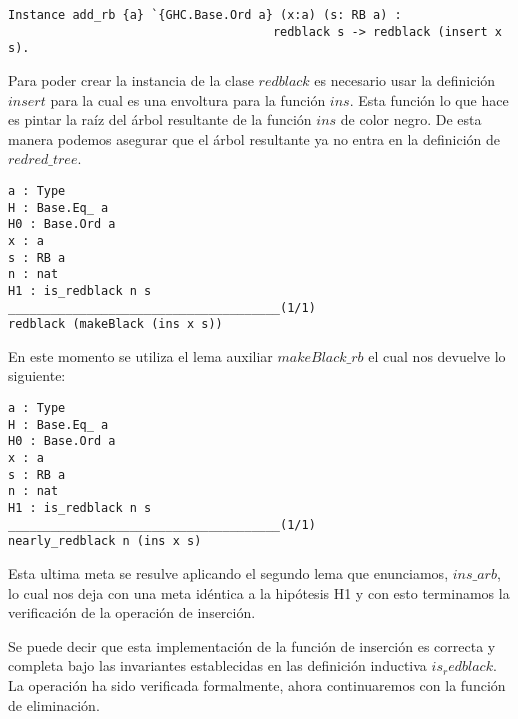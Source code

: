 \begin{verbatim}
Instance add_rb {a} `{GHC.Base.Ord a} (x:a) (s: RB a) :
                                     redblack s -> redblack (insert x s).
\end{verbatim}

Para poder crear la instancia de la clase $redblack$ es necesario usar la definici\'on $insert$
para la cual es una envoltura para la funci\'on $ins$. Esta funci\'on lo que hace es pintar la
ra\'iz del \'arbol resultante de la funci\'on $ins$ de color negro. De esta manera podemos
asegurar que el \'arbol resultante ya no entra en la definici\'on de $redred\_tree$.

\begin{verbatim}
a : Type
H : Base.Eq_ a
H0 : Base.Ord a
x : a
s : RB a
n : nat
H1 : is_redblack n s
______________________________________(1/1)
redblack (makeBlack (ins x s))
\end{verbatim}

En este momento se utiliza el lema auxiliar $makeBlack\_rb$ el cual nos devuelve lo siguiente:

\begin{verbatim}
a : Type
H : Base.Eq_ a
H0 : Base.Ord a
x : a
s : RB a
n : nat
H1 : is_redblack n s
______________________________________(1/1)
nearly_redblack n (ins x s)
\end{verbatim}

Esta ultima meta se resulve aplicando el segundo lema que enunciamos, $ins\_arb$, lo cual nos deja
con una meta idéntica a la hipótesis H1 y con esto terminamos la verificaci\'on de la operaci\'on
de inserci\'on.

Se puede decir que esta implementaci\'on de la funci\'on de inserci\'on es correcta y completa
bajo las invariantes establecidas en las definici\'on inductiva $is_redblack$. La operaci\'on ha
sido verificada formalmente, ahora continuaremos con la funci\'on de eliminaci\'on.  
